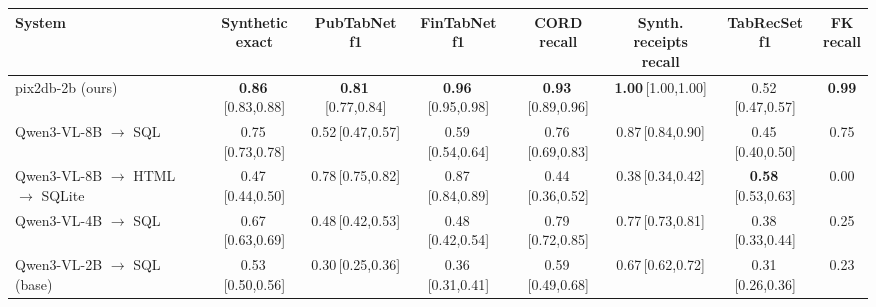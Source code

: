 \begin{tabular}{lccccccc}
\toprule
System & \makecell{Synthetic\\[-1pt]\scriptsize exact} & \makecell{PubTabNet\\[-1pt]\scriptsize f1} & \makecell{FinTabNet\\[-1pt]\scriptsize f1} & \makecell{CORD\\[-1pt]\scriptsize recall} & \makecell{Synth. receipts\\[-1pt]\scriptsize recall} & \makecell{TabRecSet\\[-1pt]\scriptsize f1} & \makecell{FK\\[-1pt]\scriptsize recall} \\
\midrule
pix2db-2b (ours) & \textbf{0.86}\,{\tiny[0.83,0.88]} & \textbf{0.81}\,{\tiny[0.77,0.84]} & \textbf{0.96}\,{\tiny[0.95,0.98]} & \textbf{0.93}\,{\tiny[0.89,0.96]} & \textbf{1.00}\,{\tiny[1.00,1.00]} & 0.52\,{\tiny[0.47,0.57]} & \textbf{0.99} \\
\midrule
Qwen3-VL-8B $\to$ SQL & 0.75\,{\tiny[0.73,0.78]} & 0.52\,{\tiny[0.47,0.57]} & 0.59\,{\tiny[0.54,0.64]} & 0.76\,{\tiny[0.69,0.83]} & 0.87\,{\tiny[0.84,0.90]} & 0.45\,{\tiny[0.40,0.50]} & 0.75 \\
Qwen3-VL-8B $\to$ HTML $\to$ SQLite & 0.47\,{\tiny[0.44,0.50]} & 0.78\,{\tiny[0.75,0.82]} & 0.87\,{\tiny[0.84,0.89]} & 0.44\,{\tiny[0.36,0.52]} & 0.38\,{\tiny[0.34,0.42]} & \textbf{0.58}\,{\tiny[0.53,0.63]} & 0.00 \\
Qwen3-VL-4B $\to$ SQL & 0.67\,{\tiny[0.63,0.69]} & 0.48\,{\tiny[0.42,0.53]} & 0.48\,{\tiny[0.42,0.54]} & 0.79\,{\tiny[0.72,0.85]} & 0.77\,{\tiny[0.73,0.81]} & 0.38\,{\tiny[0.33,0.44]} & 0.25 \\
Qwen3-VL-2B $\to$ SQL (base) & 0.53\,{\tiny[0.50,0.56]} & 0.30\,{\tiny[0.25,0.36]} & 0.36\,{\tiny[0.31,0.41]} & 0.59\,{\tiny[0.49,0.68]} & 0.67\,{\tiny[0.62,0.72]} & 0.31\,{\tiny[0.26,0.36]} & 0.23 \\
\bottomrule
\end{tabular}